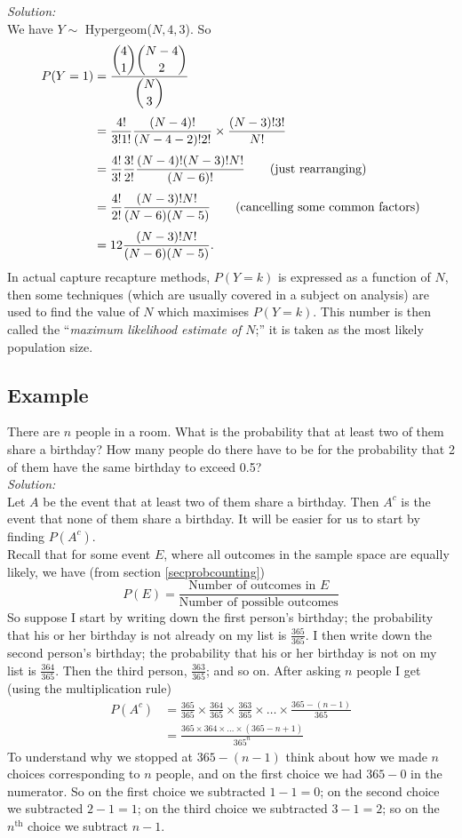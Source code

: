 \noindent \textit{Solution:} \\
We have $Y \sim$ Hypergeom($N,4,3$). So
\begin{align*}
P(Y = 1) & = \displaystyle{\frac{\displaystyle{\binom{4}{1}\binom{N-4}{2}}}{\displaystyle{\binom{N}{3}}}} \ssk
	      & = \frac{4!}{3!1!}\frac{(N-4)!}{(N-4-2)!2!}\times\frac{(N-3)!3!}{N!} \ssk
	      & = \frac{4!}{3!}\frac{3!}{2!}\frac{(N-4)!(N-3)!N!}{(N-6)!} \tag{just rearranging} \ssk
	      & = \frac{4!}{2!}\frac{(N-3)!N!}{(N-6)(N-5)} \tag{cancelling some common factors} \ssk
	      & = 12\frac{(N-3)!N!}{(N-6)(N-5)}.
\end{align*}
In actual capture recapture methods, $P(Y = k)$ is expressed as a function of $N$, then some techniques (which are usually covered in a subject on analysis) are used to find the value of $N$ which maximises $P(Y = k)$. This number is then called the ``\textit{maximum likelihood estimate of $N$};'' it is taken as the most likely population size.

\subsection{Example}
There are $n$ people in a room. What is the probability that at least two of them share a birthday? How many people do there have to be for the probability that 2 of them have the same birthday to exceed 0.5? \\

\noindent \textit{Solution:} \\
Let $A$ be the event that at least two of them share a birthday. Then $A^c$ is the event that none of them share a birthday. It will be easier for us to start by finding $P(A^c)$. \\

\noindent Recall that for some event $E$, where all outcomes in the sample space are equally likely, we have (from section \ref{secprobcounting})
\[
P(E) = \frac{\text{Number of outcomes in $E$}}{\text{Number of possible outcomes}}
\]
So suppose I start by writing down the first person's birthday; the probability that his or her birthday is not already on my list is $\frac{365}{365}$. I then write down the second person's birthday; the probability that his or her birthday is not on my list is $\frac{364}{365}$. Then the third person, $\frac{363}{365}$; and so on. After asking $n$ people I get (using the multiplication rule)
\begin{align*}
P(A^c) & = \frac{365}{365}\times\frac{364}{365}\times\frac{363}{365}\times\ldots\times\frac{365-(n-1)}{365} \\
	   & = \frac{365\times364\times\ldots\times(365-n+1)}{365^n}
\end{align*}
To understand why we stopped at $365 - (n - 1)$ think about how we made $n$ choices corresponding to $n$ people, and on the first choice we had $365 - 0$ in the numerator. So on the first choice we subtracted $1-1 = 0$; on the second choice we subtracted $2-1 = 1$; on the third choice we subtracted $3-1 = 2$; so on the $n^\text{th}$ choice we subtract $n - 1$. \\

